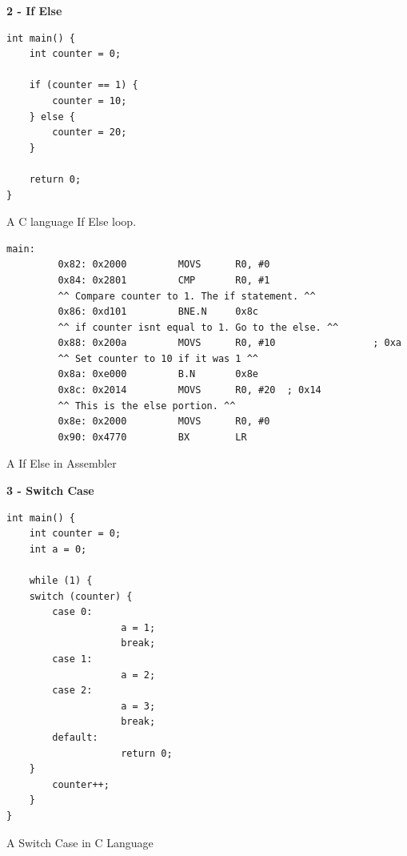 \documentclass[12pt,a4paper]{report}
\begin{document}
\begin{normalsize}
\textbf{2 - If Else} \\

\lstset{language=C}
\begin{lstlisting}
int main() {
    int counter = 0;

	if (counter == 1) {
		counter = 10;
	} else {
		counter = 20;
	}

    return 0;
}
\end{lstlisting}	
\begin{center}
\small{A C language If Else loop.}
\end{center}

\lstset{language=[x86masm]Assembler}
\begin{lstlisting}
main:
         0x82: 0x2000         MOVS      R0, #0
         0x84: 0x2801         CMP       R0, #1 
         ^^ Compare counter to 1. The if statement. ^^
         0x86: 0xd101         BNE.N     0x8c 
         ^^ if counter isnt equal to 1. Go to the else. ^^
         0x88: 0x200a         MOVS      R0, #10                 ; 0xa
         ^^ Set counter to 10 if it was 1 ^^
         0x8a: 0xe000         B.N       0x8e
         0x8c: 0x2014         MOVS      R0, #20  ; 0x14 
         ^^ This is the else portion. ^^
         0x8e: 0x2000         MOVS      R0, #0
         0x90: 0x4770         BX        LR
\end{lstlisting}	
\begin{center}
\small{A If Else in Assembler}
\end{center}


\textbf{3 - Switch Case} \\

\lstset{language=C}
\begin{lstlisting}
int main() {
    int counter = 0;
    int a = 0;

    while (1) {
	switch (counter) {
		case 0:
                    a = 1;
                    break;
        case 1:
                    a = 2;
		case 2:
                    a = 3;
                    break;
		default:
                    return 0;
	}
        counter++;
    }
}
\end{lstlisting}	
\begin{center}
\small{A Switch Case in C Language}
\end{center}


\end{normalsize}
\end{document}
